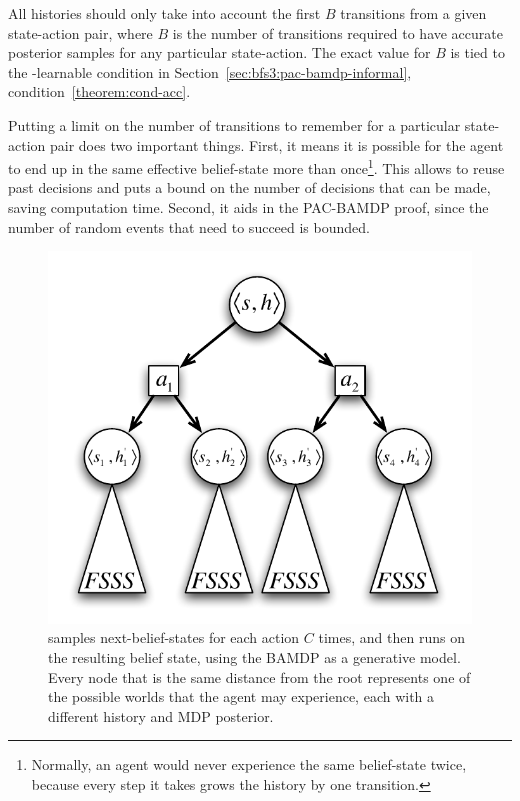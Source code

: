 All histories should only take into account the first $B$ transitions from a given state-action pair, where $B$ is the number of transitions required to have accurate posterior samples for any particular state-action. The exact value for $B$ is tied to the \bed-learnable condition in Section~\ref{sec:bfs3:pac-bamdp-informal}, condition~\ref{theorem:cond-acc}.

Putting a limit on the number of transitions to remember for a particular state-action pair does two important things. First, it means it is possible for the agent to end up in the same effective belief-state more than once\footnote{Normally, an agent would never experience the same belief-state twice, because every step it takes grows the history by one transition.}. This allows  to reuse past decisions and puts a bound on the number of decisions that can be made, saving computation time. Second, it aids in the PAC-BAMDP proof, since the number of random events that need to succeed is bounded.

\begin{figure}
\vskip 0.2in
\begin{center}
\centerline{\includegraphics[scale=0.5]{figures/bfs3}}
\caption{
 samples next-belief-states for each action $C$ times, and then runs  on the resulting belief state, using the BAMDP as a generative model. Every node that is the same distance from the root represents one of the possible worlds that the agent may experience, each with a different history and MDP posterior.
}
\label{fig:bfs3}
\end{center}
\vskip -0.2in
\end{figure} 

